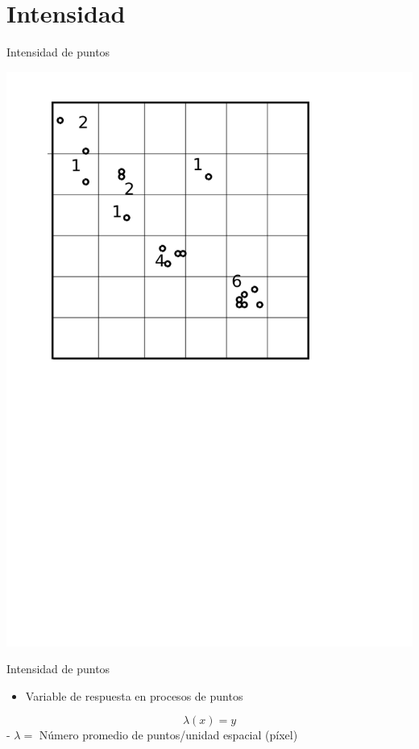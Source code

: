 \documentclass[
  11pt,
  ignorenonframetext,
]{beamer}
\providecommand{\tightlist}{%
  \setlength{\itemsep}{0pt}\setlength{\parskip}{0pt}}
\begin{document}
\hypertarget{intensidad}{%
\section{Intensidad}\label{intensidad}}

\begin{frame}{Intensidad de puntos}
\protect\hypertarget{intensidad-de-puntos}{}
\begin{center}\includegraphics{Figuras/Intensidad-1} \end{center}
\end{frame}

\begin{frame}{Intensidad de puntos}
\protect\hypertarget{intensidad-de-puntos-1}{}
\begin{itemize}
\tightlist
\item
  Variable de respuesta en procesos de puntos
\end{itemize}

\[\lambda(x) = y\] - \(\lambda=\) Número promedio de puntos/unidad
espacial (píxel)
\end{frame}
\end{document}

